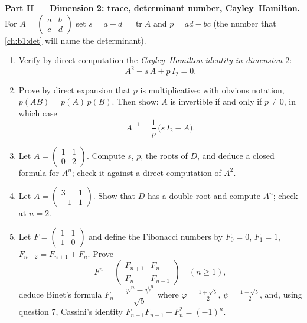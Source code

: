 \begin{problem}
\medskip
\noindent\textbf{Part II --- Dimension 2: trace, determinant
number, Cayley--Hamilton.} For $A = \begin{pmatrix} a & b\\ c &
d\end{pmatrix}$ set $s = a + d = \operatorname{tr} A$ and $p = ad
- bc$ (the number that \cref{ch:b1:det} will name the
determinant).
\begin{enumerate}[resume]
  \item Verify by direct computation the \emph{Cayley--Hamilton
        identity in dimension $2$}:
        \[
        A^2 - s\,A + p\,I_2 = 0 .
        \]
  \item Prove by direct expansion that $p$ is multiplicative:
        with obvious notation, $p(AB) = p(A)\,p(B)$. Then show:
        $A$ is invertible if and only if $p \neq 0$, in which
        case
        \[
        A^{-1} = \frac1p\,\bigl(s\,I_2 - A\bigr).
        \]
  \item Let $A = \begin{pmatrix} 1 & 1\\ 0 & 2\end{pmatrix}$.
        Compute $s$, $p$, the roots of $D$, and deduce a closed
        formula for $A^n$; check it against a direct computation
        of $A^2$.
  \item Let $A = \begin{pmatrix} 3 & 1\\ -1 & 1\end{pmatrix}$.
        Show that $D$ has a double root and compute $A^n$; check
        at $n = 2$.
  \item Let $F = \begin{pmatrix} 1 & 1\\ 1 & 0\end{pmatrix}$ and
        define the Fibonacci numbers by $F_0 = 0$, $F_1 = 1$,
        $F_{n+2} = F_{n+1} + F_n$. Prove
        \[
        F^n = \begin{pmatrix} F_{n+1} & F_n\\ F_n &
        F_{n-1}\end{pmatrix} \quad (n \geq 1),
        \]
        deduce Binet's formula $F_n = \dfrac{\varphi^n -
        \psi^n}{\sqrt5}$ where $\varphi = \frac{1 + \sqrt5}2$,
        $\psi = \frac{1 - \sqrt5}2$, and, using question 7,
        Cassini's identity $F_{n+1}F_{n-1} - F_n^2 = (-1)^n$.
\end{enumerate}


\end{problem}
